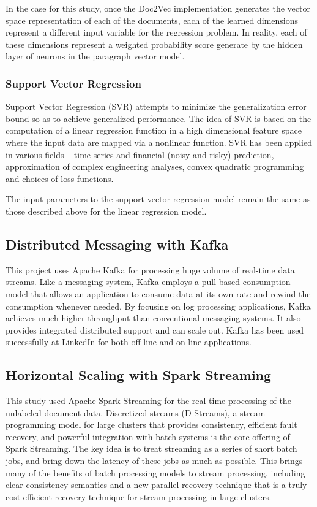 \documentclass[conference]{IEEEtran}
\begin{document}
            In the case for this study, once the Doc2Vec implementation generates the vector space representation of each of the documents, each of the learned dimensions represent a different input variable for the regression problem. In reality, each of these dimensions represent a weighted probability score generate by the hidden layer of neurons in the paragraph vector model.

        \subsubsection{Support Vector Regression}
            Support Vector Regression (SVR) attempts to minimize the generalization error bound so as to achieve generalized performance. The idea of SVR is based on the computation of a linear regression function in a high dimensional feature space where the input data are mapped via a nonlinear function. SVR has been applied in various fields – time series and financial (noisy and risky) prediction, approximation of complex engineering analyses, convex quadratic programming and choices of loss functions\cite{basak2007support}.

            The input parameters to the support vector regression model remain the same as those described above for the linear regression model.


    \subsection{Distributed Messaging with Kafka}
        This project uses Apache Kafka for processing huge volume of real-time data streams.
        Like a messaging system, Kafka employs a pull-based consumption model that allows an application to consume data at its own rate and rewind the consumption whenever needed. 
        By focusing on log processing applications, Kafka achieves much higher throughput than conventional messaging systems. 
        It also provides integrated distributed support and can scale out. 
        Kafka has been used successfully at LinkedIn for both off-line and on-line applications. \cite{kreps2011kafka}

    \subsection{Horizontal Scaling with Spark Streaming}
        This study used Apache Spark Streaming for the real-time processing of the unlabeled document data. 
        Discretized streams (D-Streams), a stream programming model for large clusters that provides consistency, efficient fault recovery, and powerful integration with batch systems is the core offering of Spark Streaming. 
        The key idea is to treat streaming as a series of short batch jobs, and bring down the latency of these jobs as much as possible. 
        This brings many of the benefits of batch processing models to stream processing, including clear consistency semantics and a new parallel recovery technique that is a truly cost-efficient recovery technique for stream processing in large clusters\cite{zaharia2012discretized}.
\end{document}

